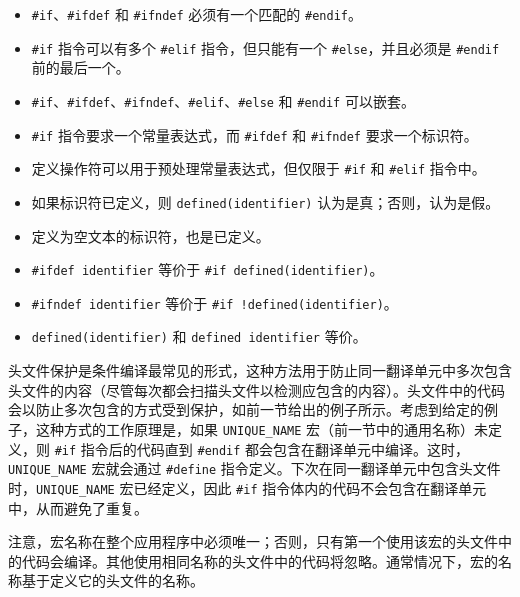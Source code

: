 \begin{itemize}
\item
\verb|#if|、\verb|#ifdef| 和 \verb|#ifndef| 必须有一个匹配的 \verb|#endif|。

\item
\verb|#if| 指令可以有多个 \verb|#elif| 指令，但只能有一个 \verb|#else|，并且必须是 \verb|#endif| 前的最后一个。

\item
\verb|#if|、\verb|#ifdef|、\verb|#ifndef|、\verb|#elif|、\verb|#else| 和 \verb|#endif| 可以嵌套。

\item
\verb|#if| 指令要求一个常量表达式，而 \verb|#ifdef| 和 \verb|#ifndef| 要求一个标识符。

\item
定义操作符可以用于预处理常量表达式，但仅限于 \verb|#if| 和 \verb|#elif| 指令中。

\item
如果标识符已定义，则 \verb|defined(identifier)| 认为是真；否则，认为是假。

\item
定义为空文本的标识符，也是已定义。

\item
\verb|#ifdef identifier| 等价于 \verb|#if defined(identifier)|。

\item
\verb|#ifndef identifier| 等价于 \verb|#if !defined(identifier)|。

\item
\verb|defined(identifier)| 和 \verb|defined identifier| 等价。
\end{itemize}

头文件保护是条件编译最常见的形式，这种方法用于防止同一翻译单元中多次包含头文件的内容（尽管每次都会扫描头文件以检测应包含的内容）。头文件中的代码会以防止多次包含的方式受到保护，如前一节给出的例子所示。考虑到给定的例子，这种方式的工作原理是，如果 \verb|UNIQUE_NAME| 宏（前一节中的通用名称）未定义，则 \verb|#if| 指令后的代码直到 \verb|#endif| 都会包含在翻译单元中编译。这时，\verb|UNIQUE_NAME| 宏就会通过 \verb|#define| 指令定义。下次在同一翻译单元中包含头文件时，\verb|UNIQUE_NAME| 宏已经定义，因此 \verb|#if| 指令体内的代码不会包含在翻译单元中，从而避免了重复。

\begin{myNotic}
注意，宏名称在整个应用程序中必须唯一；否则，只有第一个使用该宏的头文件中的代码会编译。其他使用相同名称的头文件中的代码将忽略。通常情况下，宏的名称基于定义它的头文件的名称。
\end{myNotic}

